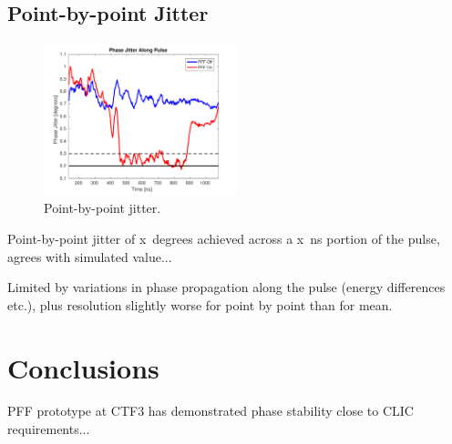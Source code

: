 \documentclass[%
 reprint,
 amsmath,amssymb,
 aps,
]{revtex4-1}
\begin{document}
\subsection{\label{ss:pbpJit}Point-by-point Jitter}

\begin{figure}
\includegraphics[width=0.5\textwidth]{figs/BestFF_pbp}%
\caption{\label{fig:BestFF_pbp}Point-by-point jitter.}
\end{figure}


Point-by-point jitter of x~degrees achieved across a x~ns portion of the pulse, agrees with simulated value...

Limited by variations in phase propagation along the pulse (energy differences etc.), plus resolution slightly worse for point by point than for mean.



\section{\label{s:conc}Conclusions}

PFF prototype at CTF3 has demonstrated phase stability close to CLIC requirements...

\end{document}
